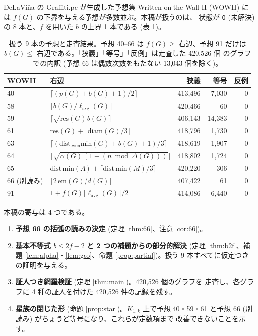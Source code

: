 \documentclass[paper=a4,fontsize=10.5pt,jafontsize=10.5pt]{jlreq}
\theoremstyle{plain}
\theoremstyle{definition}
\begin{document}
DeLaViña の Graffiti.pc が生成した予想集 Written on the Wall II (WOWII)
\cite{wowii} には $f(G)$ の下界を与える予想が多数並ぶ。本稿が扱うのは、
状態が \texttt{O} (未解決) の 8 本と、$f$ を用いた $b$ の上界 1 本である
(表 \ref{tab:conj})。

\begin{table}[htbp]
\centering
\caption{扱う 9 本の予想と走査結果。予想 40--66 は $f(G) \ge$ 右辺、予想 91
だけは $b(G) \le$ 右辺である。「狭義」「等号」「反例」は走査した 420,526 個
のグラフでの内訳 (予想 66 は偶数次数をもたない 13,043 個を除く)。}
\label{tab:conj}
\begin{tabular}{llrrr}
\toprule
WOWII & 右辺 & 狭義 & 等号 & 反例 \\
\midrule
40 & $\lceil (p(G)+b(G)+1)/2 \rceil$ & 413,496 & 7,030 & 0 \\
58 & $\lceil b(G)/\ell_{\mathrm{avg}}(G) \rceil$ & 420,466 & 60 & 0 \\
59 & $\lceil \sqrt{\mathrm{res}(G)\,b(G)} \rceil$ & 406,143 & 14,383 & 0 \\
61 & $\mathrm{res}(G) + \lceil \mathrm{diam}(G)/3 \rceil$ & 418,796 & 1,730 & 0 \\
63 & $\lceil (\mathrm{dist_{even}min}(G) + b(G) + 1)/3 \rceil$ & 418,619 & 1,907 & 0 \\
64 & $\lceil \sqrt{\alpha(G)\,(1 + (n \bmod \Delta(G)))} \rceil$ & 418,802 & 1,724 & 0 \\
65 & $\mathrm{dist\,min}(A) + \lceil \mathrm{dist\,min}(M)/3 \rceil$ & 420,220 & 306 & 0 \\
66 (別読み) & $\lceil 2\,\mathrm{em}(G)/\overline{d}(G) \rceil$ & 407,422 & 61 & 0 \\
91 & $1 + f(G)\lceil \ell_{\mathrm{avg}}(G) \rceil/2$ & 414,086 & 6,440 & 0 \\
\bottomrule
\end{tabular}
\end{table}

本稿の寄与は 4 つである。

\begin{enumerate}
\item \textbf{予想 66 の括弧の読みの決定} (定理 \ref{thm:66}、注意
  \ref{cor:66})。
\item \textbf{基本不等式 $b \le 2f-2$ と 2 つの補題からの部分的解決}
  (定理 \ref{thm:b2f}、補題 \ref{lem:alpha}・\ref{lem:geo}、命題
  \ref{prop:partial})。扱う 9 本すべてに仮定つきの証明を与える。
\item \textbf{証人つき網羅検証} (定理 \ref{thm:main})。420,526 個のグラフを
  走査し、各グラフに 4 種の証人を付けた 420,526 件の記録を残す。
\item \textbf{星族の閉じた形} (命題 \ref{prop:star})。$K_{1,k}$ 上で予想
  40・59・61 と予想 66 (別読み) がちょうど等号になり、これらが定数項まで
  改善できないことを示す。
\end{enumerate}
\end{document}
